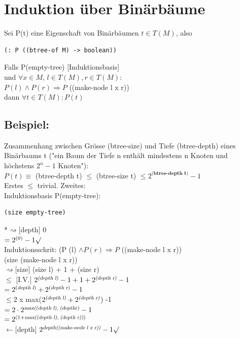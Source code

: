 \documentclass[a4paper, 20pt, openany]{book}
\begin{document}
\section{Induktion über Binärbäume}
Sei P(t) eine Eigenschaft von Binärbäumen $t \in T(M)$, also \\
\begin{lstlisting}
(: P ((btree-of M) -> boolean))
\end{lstlisting}
Falls P(empty-tree) [Induktionsbasis]\\
und $\forall x \in M$, $l \in T(M), r \in T(M)$:\\
$P(l) \land P(r) \Rightarrow P $ ((make-node l x r))\\
dann $\forall t \in T(M): P(t)$

\subsection{Beispiel:}
Zusammenhang zwischen Grösse (btree-size) und Tiefe (btree-depth) eines Binärbaums t ("ein Baum der Tiefe n enthält mindestens n Knoten und höchstens $2^n - 1$ Knoten"):\\
$P(t) \equiv $ (btree-depth t) $≤$ (btree-size t) $≤ 2^{\textbf{(btree-depth t)}} - 1$\\
Erstes $≤$ trivial. Zweites:\\
Induktionsbasis P(empty-tree):
\begin{lstlisting}
(size empty-tree)
\end{lstlisting}
*$\rightsquigarrow$[depth] 0\\
$= 2^{(0)} -1 \surd$\\
Induktionsschrit: (P (l) $\land P (r) \Rightarrow P$ ((make-node l x r))\\
(size (make-node l x r))\\
$\rightsquigarrow$[size] (size l) + 1 + (size r)\\
$≤$ [I.V.] $2^{\textsl{(depth l)}} - 1 + 1 + 2^{\textsl{(depth r)}} -1$\\
$= 2^{(\textsl{depth l})} + 2^{(\textsl{depth r})} -1$\\
$≤ 2$ x max($ 2^{\textsl{(depth l)}} + 2^{\textsl{(depth r)}}$) -1\\
$= 2 \cdot 2^{\textsl{max((depth l), (depthr)}} -1$\\
$= 2^{(1 + \textsl{max((depth l), (depth r))})}$\\

$\leftarrow$[depth] $2^{\textsl{depth((make-node l x r))}} -1 \surd$\\
\end{document}
